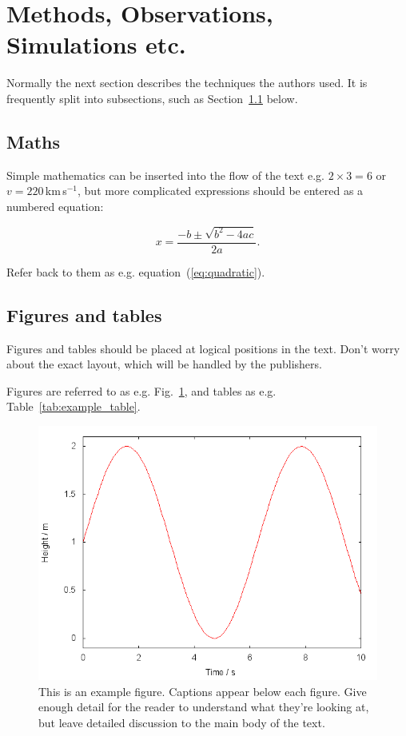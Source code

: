 \documentclass[fleqn,usenatbib]{mnras}
\begin{document}
\section{Methods, Observations, Simulations etc.}

Normally the next section describes the techniques the authors used.
It is frequently split into subsections, such as Section~\ref{sec:maths} below.

\subsection{Maths}
\label{sec:maths} %

Simple mathematics can be inserted into the flow of the text e.g. $2\times3=6$
or $v=220$\,km\,s$^{-1}$, but more complicated expressions should be entered
as a numbered equation:

\begin{equation}
    x=\frac{-b\pm\sqrt{b^2-4ac}}{2a}.
	\label{eq:quadratic}
\end{equation}

Refer back to them as e.g. equation~(\ref{eq:quadratic}).

\subsection{Figures and tables}

Figures and tables should be placed at logical positions in the text. Don't
worry about the exact layout, which will be handled by the publishers.

Figures are referred to as e.g. Fig.~\ref{fig:example_figure}, and tables as
e.g. Table~\ref{tab:example_table}.

\begin{figure}
	\includegraphics[width=\columnwidth]{example}
    \caption{This is an example figure. Captions appear below each figure.
	Give enough detail for the reader to understand what they're looking at,
	but leave detailed discussion to the main body of the text.}
    \label{fig:example_figure}
\end{figure}
\end{document}
